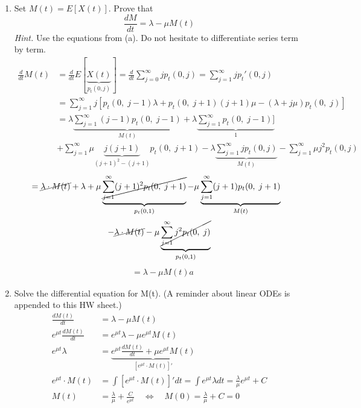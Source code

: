 \documentclass[12pt]{article}
\begin{document}
\begin{enumerate}
\begin{enumerate}[label=(\alph*)]
    \vspace{3\baselineskip}
    \item Set $M(t) = E[X(t)]$. Prove that
    $$\frac{dM}{dt} = \lambda - \mu M(t)$$
    {\sl Hint.} Use the equations from (a). Do not hesitate to differentiate series term by term.
    \begin{align}
        \frac{d}{dt}M(t) &= \frac{d}{dt} E[\underbrace{X(t)}_{p_t(0,j)}] = \frac{d}{dt} \sum\limits_{j=0}^\infty jp_t(0,j) = \sum\limits_{j=1}^\infty jp_t'(0,j) \nonumber \\
        &= \sum\limits_{j=1}^\infty j[p_t(0,\;j-1)\lambda+p_t(0,\;j+1)(j+1)\mu - (\lambda+j\mu) p_t(0,\;j)] \nonumber \\
        &=\lambda \underbrace{\sum\limits_{j=1}^\infty(j-1)p_t(0,\;j-1)}_{M(t)}+ \lambda\underbrace{\sum\limits_{j=1}^\infty p_t(0,\;j-1)]}_{1} \nonumber \\
        &+\sum\limits_{j=1}^\infty \mu \underbrace{j(j+1)}_{(j+1)^2-(j+1)}p_t(0,\;j+1) - \lambda \underbrace{\sum\limits_{j=1}^\infty j p_t(0,j)}_{M(t)} - \sum\limits_{j=1}^\infty \mu j^2 p_t(0,j) \nonumber 
    \end{align}
    \begin{align}
    &=\cancel{\lambda\cdot M(t)} + \lambda +\mu \underbrace{\cancel{\sum\limits_{j=1}^\infty (j+1)^2 p_t(0,\;j+1)}}_{p_t(0,1)} -\mu\underbrace{\sum\limits_{j=1}^\infty(j+1)p_t(0,\;j+1)}_{M(t)} \nonumber
    \end{align}
    $$-\cancel{\lambda\cdot M(t)} - \mu\underbrace{\cancel{\sum\limits_{j=1}^\infty j^2p_t(0,\;j)}}_{p_t(0,1)}$$
    \begin{align}
        & = \lambda -\mu M(t) \nonumber a
    \end{align}
    \item Solve the differential equation for M(t). (A reminder about linear ODEs is appended to this HW sheet.)
    \begin{align}
        \frac{dM(t)}{dt} &= \lambda - \mu M(t) \nonumber \\
        e^{\mu t} \frac{dM(t)}{dt} &= e^{\mu t}\lambda - \mu e^{\mu t}M(t) \nonumber \\
        e^{\mu t}\lambda &= \underbrace{e^{\mu t}\frac{dM(t)}{dt} + \mu e^{\mu t}M(t)}_{[e^{\mu t}\cdot M(t)]'}  \nonumber \\
        e^{\mu t}\cdot M(t) &= \int [e^{\mu t}\cdot M(t)]' dt = \int e^{\mu t}\lambda dt = \frac{\lambda}{\mu} e^{\mu t} + C \nonumber \\
        M(t)&= \frac{\lambda}{\mu} + \frac{C}{e^{\mu t}}\quad\Leftrightarrow\quad M(0) = \frac{\lambda}{\mu} + C = 0 \tag*{since X(0)=0} \\

\end{align}
\end{enumerate}
\end{enumerate}
\end{document}
